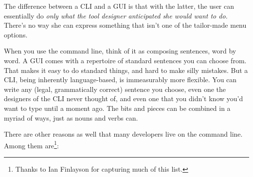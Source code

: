 The difference between a CLI and a GUI is that with the latter, the user can
essentially do \textit{only what the tool designer anticipated she would want
to do.} There's no way she can express something that isn't one of the
tailor-made menu options.

When you use the command line, think of it as composing sentences, word by
word. A GUI comes with a repertoire of standard sentences you can choose from.
That makes it easy to do standard things, and hard to make silly mistakes. But
a CLI, being inherently language-based, is immeasurably more flexible. You can
write any (legal, grammatically correct) sentence you choose, even one the
designers of the CLI never thought of, and even one that you didn't know you'd
want to type until a moment ago. The bits and pieces can be combined in a
myriad of ways, just as nouns and verbs can.

There are other reasons as well that many developers live on the command line.
Among them are\footnote{Thanks to Ian Finlayson for capturing much of this
list.}:

